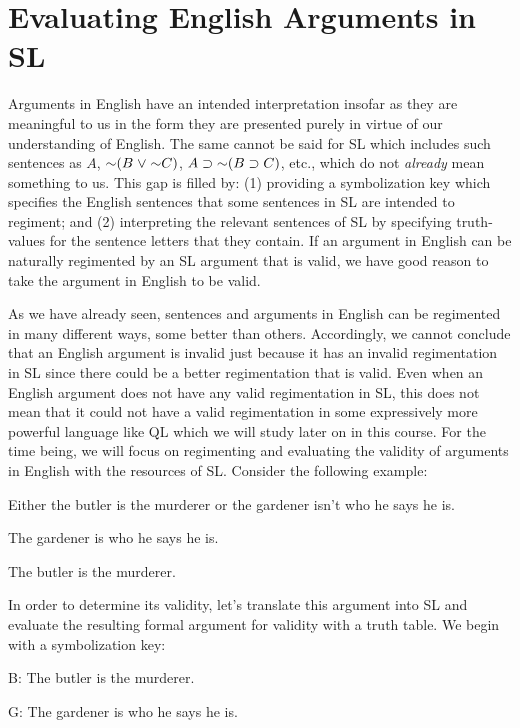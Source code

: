 \section{Evaluating English Arguments in SL}
  \label{sec:forms}

Arguments in English have an intended interpretation insofar as they are meaningful to us in the form they are presented purely in virtue of our understanding of English.
The same cannot be said for SL which includes such sentences as $A$, $\enot (B \eor \enot C)$, $A \eif \enot (B \eif C)$, etc., which do not \textit{already} mean something to us.
This gap is filled by: (1) providing a symbolization key which specifies the English sentences that some sentences in SL are intended to regiment; and (2) interpreting the relevant sentences of SL by specifying truth-values for the sentence letters that they contain.
If an argument in English can be naturally regimented by an SL argument that is valid, we have good reason to take the argument in English to be valid.

As we have already seen, sentences and arguments in English can be regimented in many different ways, some better than others.
Accordingly, we cannot conclude that an English argument is invalid just because it has an invalid regimentation in SL since there could be a better regimentation that is valid.
Even when an English argument does not have any valid regimentation in SL, this does not mean that it could not have a valid regimentation in some expressively more powerful language like QL which we will study later on in this course.
For the time being, we will focus on regimenting and evaluating the validity of arguments in English with the resources of SL.
Consider the following example:

\begin{earg}
  \item[] Either the butler is the murderer or the gardener isn't who he says he is. 
  \item[] The gardener is who he says he is.
  \item[\therefore] The butler is the murderer.
\end{earg}

In order to determine its validity, let's translate this argument into SL and evaluate the resulting formal argument for validity with a truth table.
We begin with a symbolization key:

\begin{ekey}
  \item[B:] The butler is the murderer.
  \item[G:] The gardener is who he says he is.
\end{ekey}

